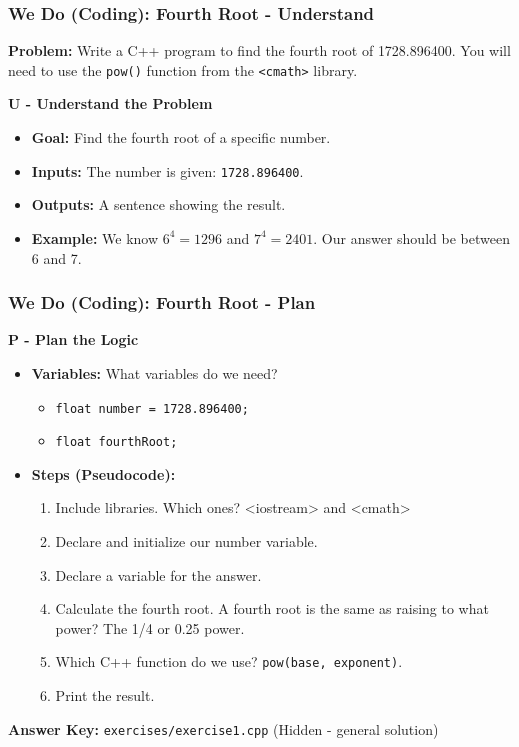 \documentclass{beamer}
\begin{document}
\begin{frame}
\frametitle{We Do (Coding): Fourth Root - Understand}
\textbf{Problem:} Write a C++ program to find the fourth root of \alert{1728.896400}. You will need to use the \texttt{pow()} function from the \texttt{<cmath>} library.

\vfill
\textbf{U - Understand the Problem}
\begin{itemize}
    \item \textbf{Goal:} Find the fourth root of a specific number.
    \item \textbf{Inputs:} The number is given: \texttt{1728.896400}.
    \item \textbf{Outputs:} A sentence showing the result.
    \item \textbf{Example:} We know $6^4 = 1296$ and $7^4 = 2401$. Our answer should be between 6 and 7.
\end{itemize}
\end{frame}

\begin{frame}
\frametitle{We Do (Coding): Fourth Root - Plan}
\textbf{P - Plan the Logic}
\begin{itemize}
    \item \textbf{Variables:} What variables do we need? \pause
    \begin{itemize}
        \item \texttt{float number = 1728.896400;}
        \item \texttt{float fourthRoot;}
    \end{itemize} \pause
    \item \textbf{Steps (Pseudocode):}
    \begin{enumerate}
        \item Include libraries. Which ones? \alert{<iostream> and <cmath>} \pause
        \item Declare and initialize our number variable. \pause
        \item Declare a variable for the answer. \pause
        \item Calculate the fourth root. A fourth root is the same as raising to what power? \alert{The 1/4 or 0.25 power}. \pause
        \item Which C++ function do we use? \alert{\texttt{pow(base, exponent)}}. \pause
        \item Print the result.
    \end{enumerate}
\end{itemize}
\textbf{Answer Key:} \texttt{exercises/exercise1.cpp} (Hidden - general solution)
\end{frame}
\end{document}
